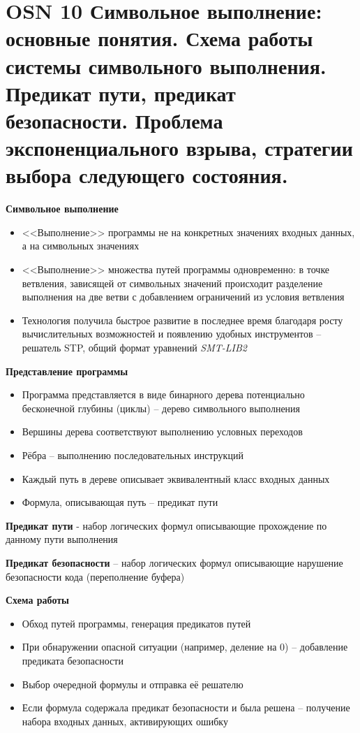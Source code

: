 \section*{OSN 10 Символьное выполнение: основные понятия. Схема работы системы символьного выполнения. Предикат пути, предикат безопасности. Проблема
экспоненциального взрыва, стратегии выбора следующего состояния.}

\textbf{Символьное выполнение}
\begin{itemize}
    \item <<Выполнение>> программы не на конкретных значениях входных данных, а на символьных значениях
    \item <<Выполнение>> множества путей программы одновременно: в точке ветвления, зависящей от символьных значений происходит разделение выполнения на две ветви с добавлением ограничений из условия ветвления
    \item Технология получила быстрое развитие в последнее время благодаря росту вычислительных возможностей и появлению удобных инструментов – решатель STP, общий формат уравнений \textit{SMT-LIB2}
\end{itemize}

\textbf{Представление программы}
\begin{itemize}
    \item Программа представляется в виде бинарного дерева потенциально бесконечной глубины (циклы) – дерево символьного выполнения
    \item Вершины дерева соответствуют выполнению условных переходов
    \item Рёбра – выполнению последовательных инструкций
    \item Каждый путь в дереве описывает эквивалентный класс входных данных
    \item Формула, описывающая путь – предикат пути
\end{itemize}

\textbf{Предикат пути} - набор логических формул описывающие прохождение по данному пути выполнения

\textbf{Предикат безопасности} – набор логических формул описывающие нарушение
безопасности кода (переполнение буфера)

\textbf{Схема работы}
\begin{itemize}
    \item Обход путей программы, генерация предикатов путей
    \item При обнаружении опасной ситуации (например, деление на 0) – добавление предиката безопасности
    \item Выбор очередной формулы и отправка её решателю
    \item Если формула содержала предикат безопасности и была решена – получение набора входных данных, активирующих ошибку
\end{itemize}

